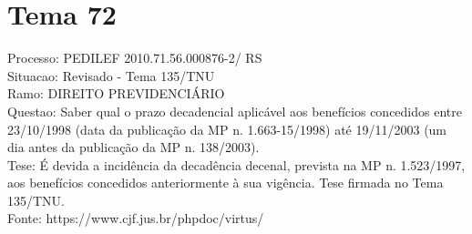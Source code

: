 \documentclass[12pt]{article}
\begin{document}
\section*{Tema 72}
Processo: PEDILEF 2010.71.56.000876-2/ RS\\
Situacao: Revisado - Tema 135/TNU\\
Ramo: DIREITO PREVIDENCIÁRIO\\
Questao: Saber qual o prazo decadencial aplicável aos benefícios concedidos entre 23/10/1998 (data da publicação da MP n. 1.663-15/1998) até 19/11/2003 (um dia antes da publicação da MP n. 138/2003).\\
Tese: É devida a incidência da decadência decenal, prevista na MP n. 1.523/1997, aos benefícios concedidos anteriormente à sua vigência. Tese firmada no Tema 135/TNU.\\
Fonte: https://www.cjf.jus.br/phpdoc/virtus/
\end{document}
